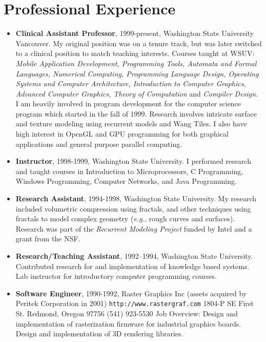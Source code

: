 \documentclass[10pt]{article}
\begin{document}
\section*{Professional Experience}

\begin{itemize}
\item {\bf Clinical Assistant Professor}, 1999-present,
Washington State University Vancouver.
My original position was on a tenure track, but was later switched
to a clinical position to match teaching interests.
Courses taught at WSUV:
{\em Mobile Application Development, Programming Tools, 
Automata and Formal Languages, 
Numerical Computing,
Programming Language Design,
Operating Systems and Computer Architecture, 
Introduction to Computer Graphics,
Advanced Computer Graphics, Theory of Computation} and {\em Compiler Design.}
I am heavily involved in program development for 
the computer science program which started in the fall of 1999.
Research involves intricate surface and texture
modeling using recurrent models and Wang Tiles.
I also have high interest in OpenGL and GPU programming for both
graphical applications and general purpose parallel computing.

\item {\bf Instructor}, 1998-1999,
Washington State University. I performed research and taught
courses in Introduction to Microprocessors, C Programming,
Windows Programming, Computer Networks, and Java Programming.

\item {\bf Research Assistant}, 1994-1998,
Washington State University.
My research included volumetric compression using fractals,
and other techniques using fractals to model complex geometry
({\it e.g.,} rough curves and surfaces). Research was part of the
{\em Recurrent Modeling Project} funded by Intel and a grant
from the NSF.

\item {\bf Research/Teaching Assistant}, 1992--1994, 
Washington State University.
Contributed research for and implementation of knowledge based systems.
Lab instructor for
introductory computer programming courses.

\item {\bf Software Engineer}, 1990-1992,
Raster Graphics Inc
(assets acquired by Peritek Corporation in 2001)
{\tt http://www.rastergraf.com}
1804-P SE First St.
Redmond, Oregon 97756
(541) 923-5530
Job Overview: 
Design and implementation of rasterization firmware for
industrial graphics boards. Design and implementation of
3D rendering libraries.
\end{itemize}
\end{document}
